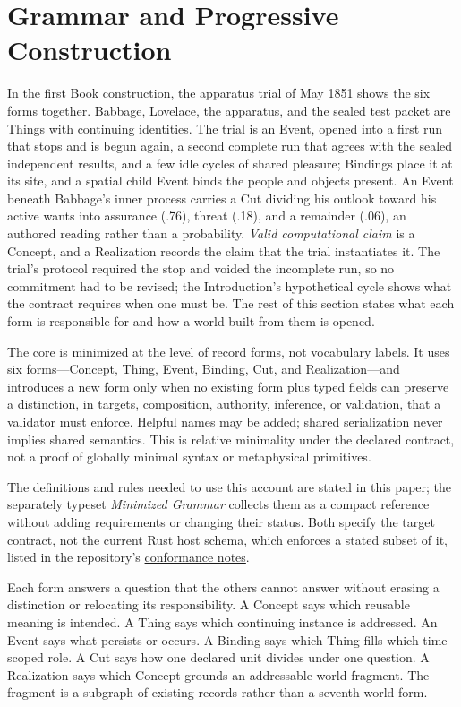\documentclass[11pt,a4paper]{article}
\begin{document}
\section{Grammar and Progressive Construction}
\label{sec:grammar}

In the first Book construction, the apparatus trial of May 1851 shows the six
forms together. Babbage, Lovelace, the apparatus, and the sealed test packet are
Things with continuing identities. The trial is an Event, opened into a first run
that stops and is begun again, a second complete run that agrees with the sealed
independent results, and a few idle cycles of shared pleasure; Bindings
place it at its site, and a spatial child Event binds the people and objects
present. An Event beneath Babbage's inner process carries a Cut dividing his
outlook toward his active wants into assurance (.76), threat (.18), and a
remainder (.06), an authored reading rather than a probability.
\emph{Valid computational claim} is a Concept, and a Realization records the
claim that the trial instantiates it. The trial's protocol required the stop and
voided the incomplete run, so no commitment had to be revised; the
Introduction's hypothetical cycle shows what the contract requires when one
must be. The rest of this section states what each form is responsible for and
how a world built from them is opened.

The core is minimized at the level of record forms, not vocabulary labels. It
uses six forms---Concept, Thing, Event, Binding, Cut, and Realization---and
introduces a new form only when no existing form plus typed fields can preserve
a distinction, in targets, composition, authority, inference, or validation, that
a validator must enforce. Helpful names may be added; shared serialization never
implies shared semantics. This is relative minimality under
the declared contract, not a proof of globally minimal syntax or metaphysical
primitives.

The definitions and rules needed to use this account are stated in this paper;
the separately typeset \emph{Minimized Grammar} collects them as a compact
reference without adding requirements or changing their status. Both specify
the target contract, not the current Rust host schema, which enforces a stated
subset of it, listed in the repository's
\href{https://github.com/emergent-wisdom/meaning-model/blob/main/rust-engine/MEANING_MODEL_CONFORMANCE.md}{conformance notes}.

Each form answers a question that the others cannot answer without erasing a
distinction or relocating its responsibility. A Concept says which reusable
meaning is intended. A Thing says which continuing instance is addressed. An
Event says what persists or occurs.
A Binding says which Thing fills which time-scoped role. A Cut says how one
declared unit divides under one question. A Realization says which Concept
grounds an addressable world fragment. The fragment is a subgraph of existing
records rather than a seventh world form.
\end{document}
